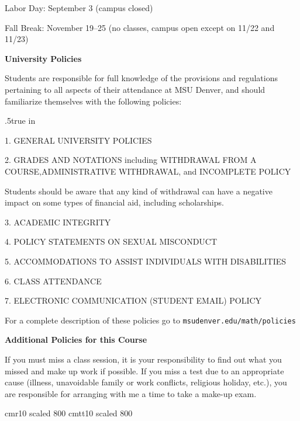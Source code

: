 Labor Day:  September 3 (campus closed)

Fall Break: November 19--25 (no classes, campus open except on 11/22 and 11/23)
\medskip
 
 {\bf University Policies}
\medskip

Students are responsible for full knowledge of the provisions and regulations pertaining
to all aspects of their attendance at MSU Denver, and should familiarize themselves with 
the following policies:

{\advance \leftskip .5true in
\item{1.}  GENERAL UNIVERSITY POLICIES

\item{2.} GRADES AND NOTATIONS including WITHDRAWAL FROM A COURSE,\hfil\break ADMINISTRATIVE
WITHDRAWAL, and INCOMPLETE POLICY

\item{}  Students should be aware that any kind of withdrawal can have a negative impact on some
types of financial aid, including scholarships.

\item{3.}  ACADEMIC INTEGRITY

\item{4.} POLICY STATEMENTS ON SEXUAL MISCONDUCT

\item{5.}  ACCOMMODATIONS TO ASSIST INDIVIDUALS WITH DISABILITIES

\item{6.}  CLASS ATTENDANCE

\item{7.} ELECTRONIC COMMUNICATION (STUDENT EMAIL) POLICY
\medskip
}

For a complete description of these policies go to
 {\tt msudenver.edu/math/policies}

\border
 
 {\bf Additional Policies for this Course}
\medskip

If you must miss a class session,  it is your
responsibility to find out what you missed and make up work if possible.
If you miss a test due to an appropriate cause (illness, unavoidable family or work conflicts,
religious holiday, etc.), you
are responsible for arranging with me a time to take a make-up exam.
\border

\vfil\eject

\font \smallerfont cmr10 scaled 800
\font \smallertt cmtt10 scaled 800

\medskip

